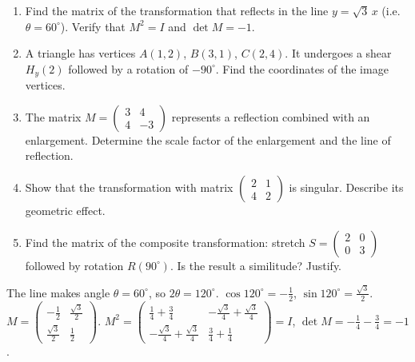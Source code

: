 \documentclass[11pt]{article}
\begin{document}
\begin{exercice}[Practice]
\begin{enumerate}
\item Find the matrix of the transformation that reflects in the line $y = \sqrt3\,x$ (i.e. $\theta = 60^\circ$). Verify that $M^2 = I$ and $\det M = -1$.
\item A triangle has vertices $A(1,2)$, $B(3,1)$, $C(2,4)$. It undergoes a shear $H_y(2)$ followed by a rotation of $-90^\circ$. Find the coordinates of the image vertices.
\item The matrix $M = \begin{pmatrix} 3 & 4 \\ 4 & -3 \end{pmatrix}$ represents a reflection combined with an enlargement. Determine the scale factor of the enlargement and the line of reflection.
\item Show that the transformation with matrix $\begin{pmatrix} 2 & 1 \\ 4 & 2 \end{pmatrix}$ is singular. Describe its geometric effect.
\item Find the matrix of the composite transformation: stretch $S = \begin{pmatrix} 2 & 0 \\ 0 & 3 \end{pmatrix}$ followed by rotation $R(90^\circ)$. Is the result a similitude? Justify.
\end{enumerate}
\end{exercice}

\begin{corrige}[Exercise 1]
The line makes angle $\theta = 60^\circ$, so $2\theta = 120^\circ$. $\cos120^\circ = -\frac12$, $\sin120^\circ = \frac{\sqrt3}{2}$.
$M = \begin{pmatrix} -\frac12 & \frac{\sqrt3}{2} \\ \frac{\sqrt3}{2} & \frac12 \end{pmatrix}$.
$M^2 = \begin{pmatrix} \frac14+\frac34 & -\frac{\sqrt3}{4}+\frac{\sqrt3}{4} \\ -\frac{\sqrt3}{4}+\frac{\sqrt3}{4} & \frac34+\frac14 \end{pmatrix} = I$, $\det M = -\frac14 - \frac34 = -1$.
\end{corrige}
\end{document}
